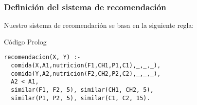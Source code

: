 \documentclass[aspectratio=169]{beamer}
\begin{document}
\begin{frame}[fragile]
\frametitle{Definición del sistema de recomendación}
Nuestro sistema de recomendación se basa en la siguiente regla:
\begin{block}{Código Prolog}
\begin{verbatim}
recomendacion(X, Y) :-
  comida(X,A1,nutricion(F1,CH1,P1,C1),_,_,_),
  comida(Y,A2,nutricion(F2,CH2,P2,C2),_,_,_),
  A2 < A1,
  similar(F1, F2, 5), similar(CH1, CH2, 5), 
  similar(P1, P2, 5), similar(C1, C2, 15).
\end{verbatim}
\end{block}
\end{frame}
\end{document}
